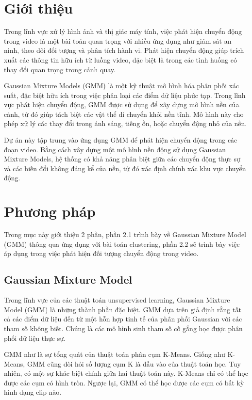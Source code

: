 \documentclass[a4paper]{article}
\begin{document}
\section{Giới thiệu}
Trong lĩnh vực xử lý hình ảnh và thị giác máy tính, việc phát hiện chuyển động trong video là một bài toán quan trọng với nhiều ứng dụng như giám sát an ninh, theo dõi đối tượng và phân tích hành vi. Phát hiện chuyển động giúp trích xuất các thông tin hữu ích từ luồng video, đặc biệt là trong các tình huống có thay đổi quan trọng trong cảnh quay.

Gaussian Mixture Models (GMM) là một kỹ thuật mô hình hóa phân phối xác suất, đặc biệt hữu ích trong việc phân loại các điểm dữ liệu phức tạp. Trong lĩnh vực phát hiện chuyển động, GMM được sử dụng để xây dựng mô hình nền của cảnh, từ đó giúp tách biệt các vật thể di chuyển khỏi nền tĩnh. Mô hình này cho phép xử lý các thay đổi trong ánh sáng, tiếng ồn, hoặc chuyển động nhỏ của nền.

Dự án này tập trung vào ứng dụng GMM để phát hiện chuyển động trong các đoạn video. Bằng cách xây dựng một mô hình nền động sử dụng Gaussian Mixture Models, hệ thống có khả năng phân biệt giữa các chuyển động thực sự và các biến đổi không đáng kể của nền, từ đó xác định chính xác khu vực chuyển động.

\section{Phương pháp}
Trong mục này giới thiệu 2 phần, phần 2.1 trình bày về Gaussian Mixture Model (GMM) thông qua ứng dụng với bài toán clustering, phần 2.2 sẽ trình bày việc áp dụng trong việc phát hiện đối tượng chuyển động trong video.

\subsection{Gaussian Mixture Model\cite{gaussian_mixture_python}}
Trong lĩnh vực của các thuật toán unsupervised learning, Gaussian Mixture Model  (GMM) là những thành phần đặc biệt. GMM dựa trên giả định rằng tất cả các điểm dữ liệu đến từ một hỗn hợp tinh tế của phân phối Gaussian với các tham số không biết. Chúng là các mô hình sinh tham số cố gắng học được phân phối dữ liệu thực sự. 

GMM như là sự tổng quát của thuật toán phân cụm K-Means. Giống như K-Means, GMM cũng đòi hỏi số lượng cụm K là đầu vào của thuật toán học. Tuy nhiên, có một sự khác biệt chính giữa hai thuật toán này. K-Means chỉ có thể học được các cụm có hình tròn. Ngược lại, GMM có thể học được các cụm có bất kỳ hình dạng elip nào.
\end{document}
